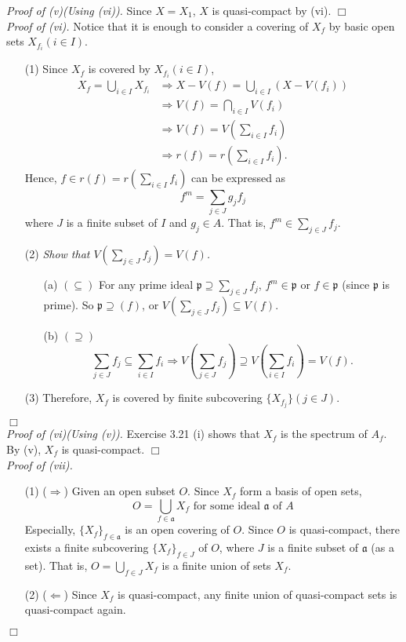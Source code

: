 \documentclass{article}
\begin{document}
\emph{Proof of (v)(Using (vi)).}
Since $X = X_1$, $X$ is quasi-compact by (vi).
$\Box$ \\

\emph{Proof of (vi).}
Notice that it is enough to consider a covering of $X_f$
by basic open sets $X_{f_i} (i \in I)$.
\begin{enumerate}
\item[(1)]
Since $X_f$ is covered by $X_{f_i} (i \in I)$,
\begin{align*}
X_f = \bigcup_{i \in I} X_{f_i}
&\Longrightarrow X - V(f) = \bigcup_{i \in I} (X - V(f_i)) \\
&\Longrightarrow V(f) = \bigcap_{i \in I} V(f_i) \\
&\Longrightarrow V(f) = V\left( \sum_{i \in I} f_i \right) \\
&\Longrightarrow r(f) = r\left( \sum_{i \in I} f_i \right).
\end{align*}
Hence, $f \in r(f) = r\left( \sum_{i \in I} f_i \right)$ can be expressed as
$$f^m = \sum_{j \in J} g_j f_j$$
where $J$ is a finite subset of $I$ and $g_j \in A$.
That is, $f^m \in \sum_{j \in J} f_j$.
\item[(2)]
\emph{Show that $V\left( \sum_{j \in J} f_j \right) = V(f)$.}
\begin{enumerate}
  \item[(a)]
  $(\subseteq)$ For any prime ideal $\mathfrak{p} \supseteq \sum_{j \in J} f_j$,
  $f^m \in \mathfrak{p}$ or $f \in \mathfrak{p}$ (since $\mathfrak{p}$ is prime).
  So $\mathfrak{p} \supseteq (f)$,
  or $V\left( \sum_{j \in J} f_j \right) \subseteq V(f)$.
  \item[(b)]
  $(\supseteq)$
  $$\sum_{j \in J} f_j \subseteq \sum_{i \in I} f_i
  \Longrightarrow
  V\left( \sum_{j \in J} f_j \right) \supseteq V\left( \sum_{i \in I} f_i \right) = V(f).$$
\end{enumerate}
\item[(3)]
Therefore, $X_f$ is covered by finite subcovering $\{X_{f_j}\} (j \in J)$.
\end{enumerate}
$\Box$ \\

\emph{Proof of (vi)(Using (v)).}
Exercise 3.21 (i) shows that $X_f$ is the spectrum of $A_f$.
By (v), $X_f$ is quasi-compact.
$\Box$ \\

\emph{Proof of (vii).}
\begin{enumerate}
\item[(1)]
($\Longrightarrow$)
Given an open subset $O$.
Since $X_f$ form a basis of open sets,
$$O = \bigcup_{f \in \mathfrak{a}} X_f \text{ for some ideal $\mathfrak{a}$ of $A$}$$
Especially, $\{X_f\}_{f \in \mathfrak{a}}$ is an open covering of $O$.
Since $O$ is quasi-compact, there exists a finite subcovering $\{X_f\}_{f \in J}$ of $O$,
where $J$ is a finite subset of $\mathfrak{a}$ (as a set).
That is,
$O = \bigcup_{f \in J} X_f$ is a finite union of sets $X_f$.
\item[(2)]
($\Longleftarrow$)
Since $X_f$ is quasi-compact, any finite union of quasi-compact sets is quasi-compact again.
\end{enumerate}
$\Box$ \\\\
\end{document}
